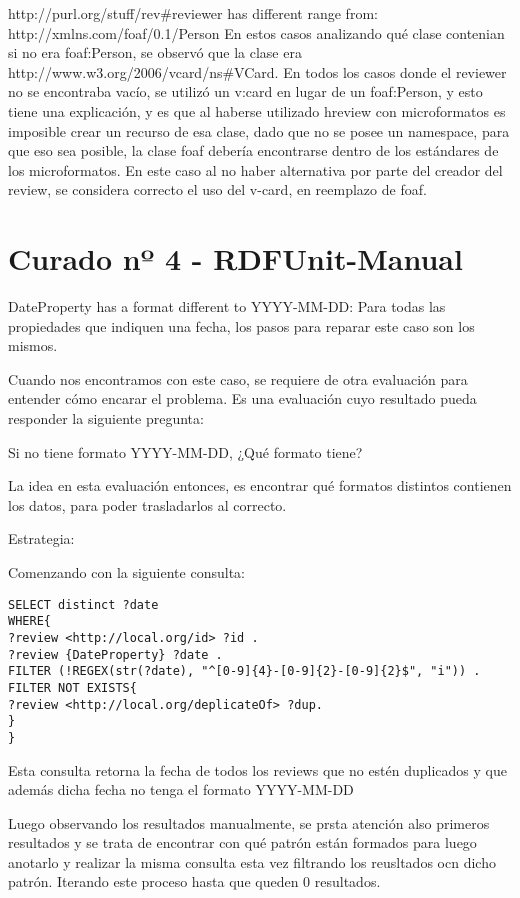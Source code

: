 http://purl.org/stuff/rev\#reviewer has different range from: http://xmlns.com/foaf/0.1/Person
En estos casos analizando qué clase contenian si no era foaf:Person, se observó que la clase era http://www.w3.org/2006/vcard/ns\#VCard.
En todos los casos donde el reviewer no se encontraba vacío, se utilizó un v:card en lugar de un foaf:Person, y esto tiene una explicación, 
y es que al haberse utilizado hreview con microformatos es imposible crear un recurso de esa clase, dado que no se posee un namespace, para que 
eso sea posible, la clase foaf debería encontrarse dentro de los estándares de los microformatos. 
En este caso al no haber alternativa por parte del creador del review, se considera correcto el uso del v-card, en reemplazo de foaf.

\section{Curado nº 4 - RDFUnit-Manual}
\label{section:curado-manual}

{DateProperty} has a format different to YYYY-MM-DD:
Para todas las propiedades que indiquen una fecha, los pasos para reparar este caso son los mismos.

Cuando nos encontramos con este caso, se requiere de otra evaluación para entender cómo encarar el problema. Es una evaluación cuyo resultado
pueda responder la siguiente pregunta:

Si no tiene formato YYYY-MM-DD, ¿Qué formato tiene?

La idea en esta evaluación entonces, es encontrar qué formatos distintos contienen los datos, para poder trasladarlos al correcto.

Estrategia:

Comenzando con la siguiente consulta:


\begin{lstlisting}[frame=single]  
SELECT distinct ?date 
WHERE{
?review <http://local.org/id> ?id .
?review {DateProperty} ?date .
FILTER (!REGEX(str(?date), "^[0-9]{4}-[0-9]{2}-[0-9]{2}$", "i")) .
FILTER NOT EXISTS{
?review <http://local.org/deplicateOf> ?dup.
}
}
\end{lstlisting}



Esta consulta retorna la fecha de todos los reviews que no estén duplicados y que además dicha fecha no tenga el formato YYYY-MM-DD

Luego observando los resultados manualmente, se prsta atención also primeros resultados y se trata de encontrar con qué patrón están formados 
para luego anotarlo y realizar la misma consulta esta vez filtrando los reusltados ocn dicho patrón. Iterando este proceso hasta que 
queden 0 resultados.

